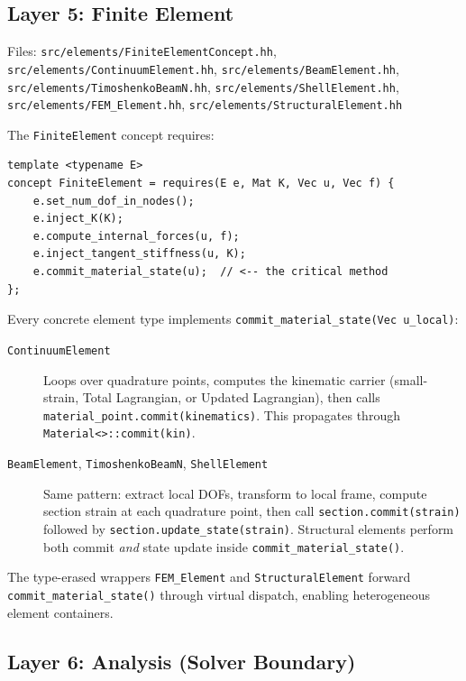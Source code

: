 \subsection{Layer 5: Finite Element}
\label{sec:layer5-element}

Files:
\texttt{src/elements/FiniteElementConcept.hh},
\texttt{src/elements/ContinuumElement.hh},
\texttt{src/elements/BeamElement.hh},
\texttt{src/elements/TimoshenkoBeamN.hh},
\texttt{src/elements/ShellElement.hh},
\texttt{src/elements/FEM\_Element.hh},
\texttt{src/elements/StructuralElement.hh}

The \texttt{FiniteElement} concept requires:

\begin{verbatim}
template <typename E>
concept FiniteElement = requires(E e, Mat K, Vec u, Vec f) {
    e.set_num_dof_in_nodes();
    e.inject_K(K);
    e.compute_internal_forces(u, f);
    e.inject_tangent_stiffness(u, K);
    e.commit_material_state(u);  // <-- the critical method
};
\end{verbatim}

Every concrete element type implements
\texttt{commit\_material\_state(Vec u\_local)}:

\begin{description}
  \item[\texttt{ContinuumElement}]
    Loops over quadrature points, computes the kinematic carrier
    (small-strain, Total Lagrangian, or Updated Lagrangian), then
    calls \texttt{material\_point.commit(kinematics)}.
    This propagates through \texttt{Material<>::commit(kin)}.

  \item[\texttt{BeamElement}, \texttt{TimoshenkoBeamN}, \texttt{ShellElement}]
    Same pattern: extract local DOFs, transform to local frame,
    compute section strain at each quadrature point, then call
    \texttt{section.commit(strain)} followed by
    \texttt{section.update\_state(strain)}.  Structural elements
    perform both commit \emph{and} state update inside
    \texttt{commit\_material\_state()}.
\end{description}

The type-erased wrappers \texttt{FEM\_Element} and
\texttt{StructuralElement} forward \texttt{commit\_material\_state()}
through virtual dispatch, enabling heterogeneous element containers.

\subsection{Layer 6: Analysis (Solver Boundary)}
\label{sec:layer6-analysis}

